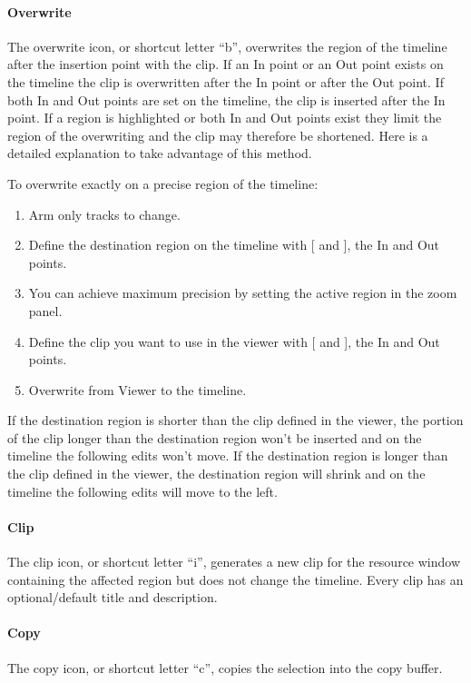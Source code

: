 \paragraph{Overwrite} The overwrite icon, or shortcut letter “b”, overwrites the region of the timeline after the insertion point with the clip. If an In point or an Out point exists on the timeline the clip is overwritten after the In point or after the Out point. If both In and Out points are set on the timeline, the clip is inserted after the In point. If a region is highlighted or both In and Out points exist they limit the region of the overwriting and the clip may therefore be shortened. Here is a detailed explanation to take advantage of this method.

To overwrite exactly on a precise region of the timeline:

\begin{enumerate} [noitemsep]
    \item Arm only tracks to change.
    \item Define the destination region on the timeline with [ and ], the In and Out points.
    \item You can achieve maximum precision by setting the active region in the zoom panel.
    \item Define the clip you want to use in the viewer with [ and ], the In and Out points.
    \item Overwrite from Viewer to the timeline.
\end{enumerate}

If the destination region is shorter than the clip defined in the viewer, the portion of the clip longer than the destination region won't be inserted and on the timeline the following edits won't move.
If the destination region is longer than the clip defined in the viewer, the destination region will shrink and on the timeline the following edits will move to the left.

\paragraph{Clip} The clip icon, or shortcut letter “i”, generates a new clip for the resource window containing the affected region but does not change the timeline.  Every clip has an optional/default title and description.

\paragraph{Copy} The copy icon, or shortcut letter “c”, copies the selection into the copy buffer.

